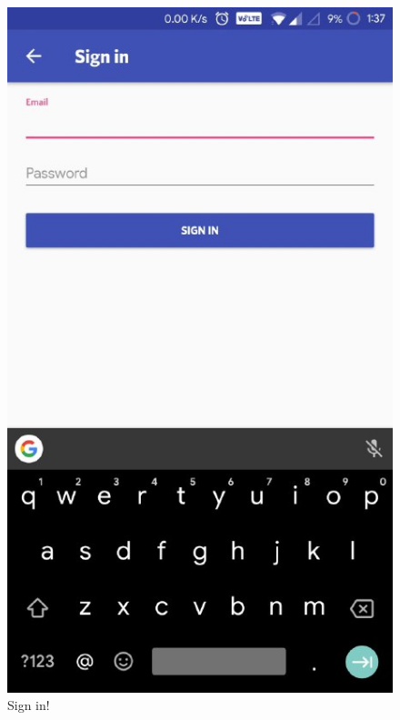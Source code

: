 \begin{figure}[h]
\begin{center}
\includegraphics[scale=0.6]{3/two.jpeg}
\caption{Sign in!}
\label{fig:two}
\end{center}
\end{figure}

